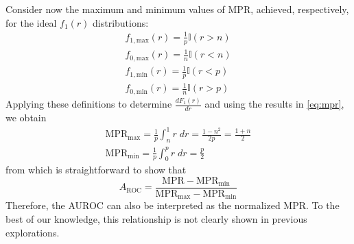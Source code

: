 Consider now the maximum and minimum values of MPR, achieved, respectively, for the ideal $f_1(r)$ distributions:
%
\begin{gather}
    f_{1, \text{max}}(r) = \frac{1}{p}\mathbb{I}(r > n)\\
    f_{0, \text{max}}(r) = \frac{1}{n}\mathbb{I}(r < n)\\
    f_{1, \text{min}}(r) = \frac{1}{p}\mathbb{I}(r < p)\\
    f_{0, \text{min}}(r) = \frac{1}{n}\mathbb{I}(r > p)
\end{gather}
%
Applying these definitions to determine $\frac{dF_1(r)}{dr}$ and using the results in \autoref{eq:mpr}, we obtain
%
%
%
%
%
\begin{gather}
    \text{MPR}_\text{max}
        = \frac{1}{p} \int_n^1 r\;dr
        = \frac{1 - n^2}{2p}
        = \frac{1 + n}{2}
    \\
    \text{MPR}_\text{min} = \frac{1}{p} \int_0^p r\;dr = \frac{p}{2}
\end{gather}
%
from which is straightforward to show that
%
\begin{equation}
    A_\text{ROC}
        = \frac{
            \text{MPR} - \text{MPR}_\text{min}
        }{
            \text{MPR}_\text{max} - \text{MPR}_\text{min}
        }
\end{equation}
%
Therefore, the AUROC can also be interpreted as the normalized MPR.
To the best of our knowledge, this relationship is not clearly shown in previous explorations.  %

